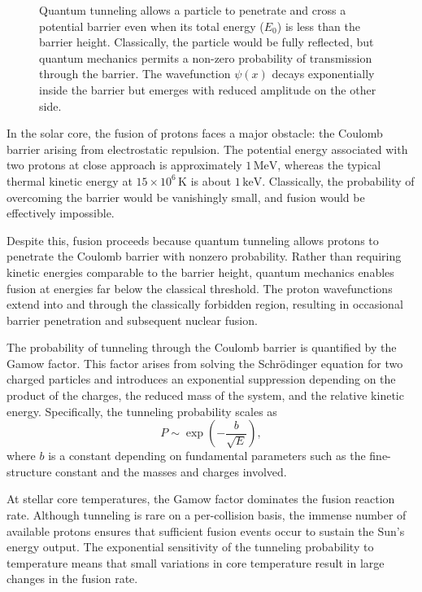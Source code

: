 \begin{figure}[H]
\caption{Quantum tunneling allows a particle to penetrate and cross a potential barrier even when its total energy ($E_0$) is less than the barrier height. Classically, the particle would be fully reflected, but quantum mechanics permits a non-zero probability of transmission through the barrier. The wavefunction $\psi(x)$ decays exponentially inside the barrier but emerges with reduced amplitude on the other side.}
\end{figure}

In the solar core, the fusion of protons faces a major obstacle: the Coulomb barrier arising from electrostatic repulsion. The potential energy associated with two protons at close approach is approximately $1\,\text{MeV}$, whereas the typical thermal kinetic energy at $15 \times 10^6\,\text{K}$ is about $1\,\text{keV}$. Classically, the probability of overcoming the barrier would be vanishingly small, and fusion would be effectively impossible.

Despite this, fusion proceeds because quantum tunneling allows protons to penetrate the Coulomb barrier with nonzero probability. Rather than requiring kinetic energies comparable to the barrier height, quantum mechanics enables fusion at energies far below the classical threshold. The proton wavefunctions extend into and through the classically forbidden region, resulting in occasional barrier penetration and subsequent nuclear fusion.

The probability of tunneling through the Coulomb barrier is quantified by the Gamow factor. This factor arises from solving the Schrödinger equation for two charged particles and introduces an exponential suppression depending on the product of the charges, the reduced mass of the system, and the relative kinetic energy. Specifically, the tunneling probability scales as
\[
P \sim \exp\left( -\frac{b}{\sqrt{E}} \right),
\]
where \( b \) is a constant depending on fundamental parameters such as the fine-structure constant and the masses and charges involved.

At stellar core temperatures, the Gamow factor dominates the fusion reaction rate. Although tunneling is rare on a per-collision basis, the immense number of available protons ensures that sufficient fusion events occur to sustain the Sun’s energy output. The exponential sensitivity of the tunneling probability to temperature means that small variations in core temperature result in large changes in the fusion rate.

